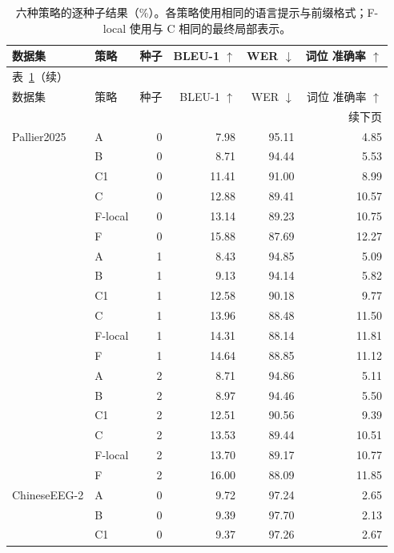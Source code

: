 \begingroup
\papertablestyle
\begin{longtable}{@{}llrrrr@{}}
\caption{六种策略的逐种子结果（\%）。各策略使用相同的语言提示与前缀格式；F-local 使用与 C 相同的最终局部表示。}
\label{tab:sentence_by_seed_acf}\\
\toprule
数据集 & 策略 & 种子 & BLEU-1 $\uparrow$ & WER $\downarrow$ & \shortstack{词位\\准确率 $\uparrow$} \\
\midrule\endfirsthead
\multicolumn{6}{l}{表~\ref{tab:sentence_by_seed_acf}（续）}\\
\toprule
数据集 & 策略 & 种子 & BLEU-1 $\uparrow$ & WER $\downarrow$ & \shortstack{词位\\准确率 $\uparrow$} \\
\midrule\endhead
\midrule\multicolumn{6}{r}{续下页}\\\endfoot
\bottomrule\endlastfoot
Pallier2025 & A & 0 & 7.98 & 95.11 & 4.85 \\
 & B & 0 & 8.71 & 94.44 & 5.53 \\
 & C1 & 0 & 11.41 & 91.00 & 8.99 \\
 & C & 0 & 12.88 & 89.41 & 10.57 \\
 & F-local & 0 & 13.14 & 89.23 & 10.75 \\
 & F & 0 & 15.88 & 87.69 & 12.27 \\
\addlinespace
 & A & 1 & 8.43 & 94.85 & 5.09 \\
 & B & 1 & 9.13 & 94.14 & 5.82 \\
 & C1 & 1 & 12.58 & 90.18 & 9.77 \\
 & C & 1 & 13.96 & 88.48 & 11.50 \\
 & F-local & 1 & 14.31 & 88.14 & 11.81 \\
 & F & 1 & 14.64 & 88.85 & 11.12 \\
\addlinespace
 & A & 2 & 8.71 & 94.86 & 5.11 \\
 & B & 2 & 8.97 & 94.46 & 5.50 \\
 & C1 & 2 & 12.51 & 90.56 & 9.39 \\
 & C & 2 & 13.53 & 89.44 & 10.51 \\
 & F-local & 2 & 13.70 & 89.17 & 10.77 \\
 & F & 2 & 16.00 & 88.09 & 11.85 \\
\midrule
ChineseEEG-2 & A & 0 & 9.72 & 97.24 & 2.65 \\
 & B & 0 & 9.39 & 97.70 & 2.13 \\
 & C1 & 0 & 9.37 & 97.26 & 2.67 \\

\end{longtable}
